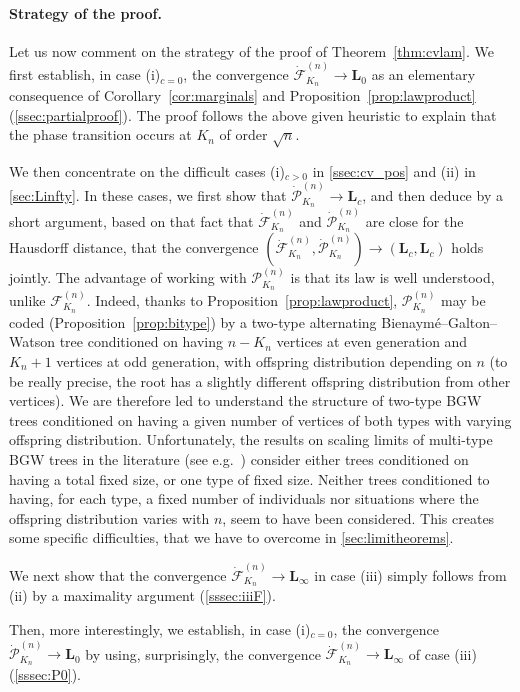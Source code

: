 \documentclass[10pt]{amsart}
\theoremstyle{definition}\newtheorem{defi}[theo]{Definition}\newtheorem{rema}[theo]{Remark}\newtheorem{exam}[theo]{Example}\newtheorem{exem}[theo]{Example}\newtheorem{nota}[theo]{Notation}
\def\FKn{\mathcal{F}^{(n)}_{K_{n}}}
\def\PKn{\mathcal{P}^{(n)}_{K_{n}}}
\def\dFKn{\dot{\mathcal{F}}^{(n)}_{K_{n}}}
\def\dPKn{\dot{\mathcal{P}}^{(n)}_{K_{n}}}
\begin{document}
\paragraph*{Strategy of the proof.} Let us now comment on the strategy of the proof of  Theorem~\ref{thm:cvlam}. We first establish, in case (i)$_{c=0}$, the convergence $\dFKn \rightarrow \mathbf{L}_{0}$ as an elementary consequence of Corollary~\ref{cor:marginals} and Proposition~\ref{prop:lawproduct} (\cref{ssec:partialproof}). The proof follows the above given heuristic to explain that the phase transition occurs at $ K_{n}$ of order $\sqrt{n}$.

We then concentrate on the difficult cases  (i)$_{c>0}$ in \cref{ssec:cv_pos}
and (ii) in \cref{sec:Linfty}. In these cases, we first show that  $  \dPKn
\rightarrow \mathbf{L}_{c}$, and then deduce by a short argument, based on
that fact that $\dFKn$ and $\dPKn$ are close for the Hausdorff distance, that
the convergence $(\dFKn,\dPKn) \rightarrow (\mathbf{L}_{c},\mathbf{L}_{c})$
holds jointly.  The advantage of working with $\PKn$ is that its law is well
understood, unlike $\FKn$. Indeed, thanks to
Proposition~\ref{prop:lawproduct},  $\PKn$ may be coded
(Proposition~\ref{prop:bitype}) by a two-type  alternating
Bienaym\'e--Galton--Watson tree conditioned on having $n-K_{n}$ vertices at
even generation and $K_{n}+1$ vertices at odd generation, with offspring
distribution depending on $n$ (to be really precise, the root has a slightly
different offspring distribution from other vertices). We are therefore led
to understand the structure of two-type BGW trees conditioned on having a
given number of vertices of both types with varying offspring distribution.
Unfortunately, the results on scaling limits of multi-type BGW trees in the
literature (see e.g.\ \cite{MM07,Mie08b,Ber16}) consider either trees
conditioned on having a total fixed size, or one type of fixed size. Neither
trees conditioned to having, for each type, a fixed number of individuals nor
situations where the offspring distribution varies with $n$, seem to have
been considered. This creates some specific difficulties, that we have to
overcome in \cref{sec:limitheorems}.

We next show that the convergence $\dFKn \rightarrow \mathbf{L}_{\infty}$  in case (iii) simply follows from (ii) by a maximality argument (\cref{sssec:iiiF}).

Then,  more interestingly, we establish, in case (i)$_{c=0}$, the  convergence $\dPKn \rightarrow \mathbf{L}_{0}$ by using, surprisingly, the convergence $\dFKn \rightarrow \mathbf{L}_{\infty}$ of case (iii) (\cref{sssec:P0}).
\end{document}
